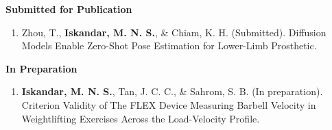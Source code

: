 \documentclass[../main.tex]{subfiles}
\begin{document}
            
        
        \textbf{Submitted for Publication}
        \def\labelprefix{S}
        \begin{enumerate}
            
            
            \item\label{article: diffusion_openpose}{Zhou, T., \textbf{Iskandar, M. N. S.}, \& Chiam, K. H. (Submitted). Diffusion Models Enable Zero-Shot Pose Estimation for Lower-Limb Prosthetic.}
        \end{enumerate}

        \textbf{In Preparation}
        \def\labelprefix{P}
        \begin{enumerate}
            
            \item\label{article: fyp}{\textbf{Iskandar, M. N. S.}, Tan, J. C. C., \& Sahrom, S. B. (In preparation). Criterion Validity of The FLEX Device Measuring Barbell Velocity in Weightlifting Exercises Across the Load-Velocity Profile.}
            
        \end{enumerate}
        
  \resumeSubHeadingListEnd
\end{document}
